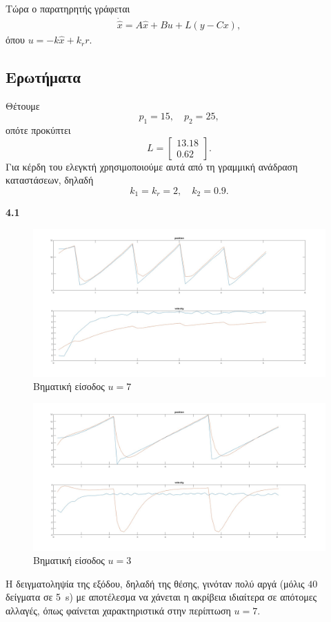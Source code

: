 \documentclass[12pt]{article}
\begin{document}
Τώρα ο παρατηρητής γράφεται
\begin{align*}
    \dot{\hat{x}} = A\hat{x} + Bu + L(y - Cx), 
\end{align*}
όπου \(u = -k\hat{x} + k_r r\). 

\subsection*{Ερωτήματα}
Θέτουμε 
\begin{equation*}
    p_1 = 15, \quad p_2 = 25, 
\end{equation*}
οπότε προκύπτει 
\begin{equation*}
    L = \begin{bmatrix}
        13.18 \\
        0.62
    \end{bmatrix}.
\end{equation*}
Για κέρδη του ελεγκτή χρησιμοποιούμε αυτά από τη γραμμική ανάδραση καταστάσεων, δηλαδή
\begin{equation*}
    k_1 = k_r = 2, \quad k_2 = 0.9.
\end{equation*}

\textbf{4.1} 
\begin{figure}[H]
    \centering
    \caption*{Βηματική είσοδος \(u = 7\)}
    \includegraphics*[scale=0.25]{lab4a_u7_all.jpg}
\end{figure}
\begin{figure}[H]
    \centering
    \caption*{Βηματική είσοδος \(u = 3\)}
    \includegraphics*[scale=0.25]{lab4a_u3_all.jpg}
\end{figure}
Η δειγματοληψία της εξόδου, δηλαδή της θέσης, γινόταν πολύ αργά (μόλις \(40\) δείγματα σε \SI{5}{s}) με αποτέλεσμα να χάνεται η ακρίβεια ιδιαίτερα σε απότομες αλλαγές, όπως φαίνεται χαρακτηριστικά στην περίπτωση \(u = 7\). 
\end{document}
